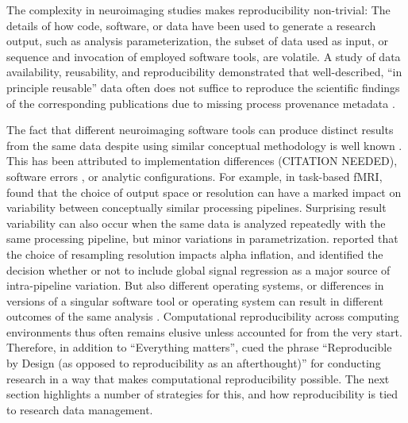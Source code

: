 The complexity in neuroimaging studies makes reproducibility non-trivial:
The details of how code, software, or data have been used to generate a research output, such as analysis parameterization, the subset of data used as input, or sequence and invocation of employed software tools, are volatile.
A study of data availability, reusability, and reproducibility demonstrated that well-described, ``in principle reusable'' data often does not suffice to reproduce the scientific findings of the corresponding publications due to  missing process provenance metadata \citep{hardwicke2018data}.


The fact that different neuroimaging software tools can produce distinct results from the same data despite using similar conceptual methodology is well known \citep{bowring2019exploring}.
This has been attributed to implementation differences (CITATION NEEDED), software errors \citep{eklund2016cluster}, or analytic configurations.
For example, in task-based fMRI, \citet{li2021moving} found that the choice of output space or resolution can have a marked impact on variability between conceptually similar processing pipelines.
Surprising result variability can also occur when the same data is analyzed repeatedly with the same processing pipeline, but minor variations in parametrization. \citet{mueller2017commentary} reported that the choice of resampling resolution impacts alpha inflation, and \citet{li2021moving} identified the decision whether or not to include global signal regression as a major source of intra-pipeline variation.
But also different operating systems, or differences in versions of a singular software tool or operating system can result in different outcomes of the same analysis \citep{gronenschild2012effects} \citep{glatard2015reproducibility}.
Computational reproducibility across computing environments thus often remains elusive unless accounted for from the very start.
Therefore, in addition to ``Everything matters'',  \citet{kennedy2019everything} cued the phrase ``Reproducible by Design (as opposed to reproducibility as an afterthought)'' for conducting research in a way that makes computational reproducibility possible.
The next section highlights a number of strategies for this, and how reproducibility is tied to research data management.



